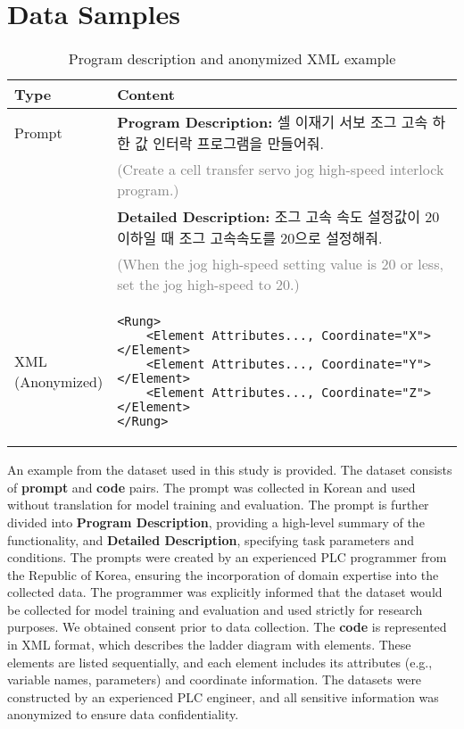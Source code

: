\section{Data Samples}\label{sec:data_samples}

\begin{table*}[!htbp]
    \small
    \centering
    \begin{tabular}{|p{}|p{}|} 
        \toprule
        \textbf{Type} & \textbf{Content} \\ \midrule
        
        Prompt 
        & \textbf{Program Description:} 셀 이재기 서보 조그 고속 하한 값 인터락 프로그램을 만들어줘. \\[3pt]
        & \textcolor{gray}{(Create a cell transfer servo jog high-speed interlock program.)} \\[3pt]
        & \textbf{Detailed Description:} 조그 고속 속도 설정값이 20 이하일 때 조그 고속속도를 20으로 설정해줘. \\[3pt]
        & \textcolor{gray}{(When the jog high-speed setting value is 20 or less, set the jog high-speed to 20.)} \\[3pt] \midrule

        \makecell[l]{XML \\ (Anonymized)}
        & \begin{lstlisting}[basicstyle=\ttfamily, aboveskip=0pt, belowskip=0pt]
<Rung>
    <Element Attributes..., Coordinate="X"></Element>
    <Element Attributes..., Coordinate="Y"></Element>
    <Element Attributes..., Coordinate="Z"></Element>
</Rung>
\end{lstlisting} \\ \bottomrule
    \end{tabular}
    \caption{Program description and anonymized XML example}
    \label{tab:appendix_sample}
\end{table*}

An example from the dataset used in this study is provided. The dataset consists of \textbf{prompt} and \textbf{code} pairs. The prompt was collected in Korean and used without translation for model training and evaluation. The prompt is further divided into \textbf{Program Description}, providing a high-level summary of the functionality, and \textbf{Detailed Description}, specifying task parameters and conditions. The prompts were created by an experienced PLC programmer from the Republic of Korea, ensuring the incorporation of domain expertise into the collected data. The programmer was explicitly informed that the dataset would be collected for model training and evaluation and used strictly for research purposes. We obtained consent prior to data collection. The \textbf{code} is represented in XML format, which describes the ladder diagram with elements. These elements are listed sequentially, and each element includes its attributes (e.g., variable names, parameters) and coordinate information. The datasets were constructed by an experienced PLC engineer, and all sensitive information was anonymized to ensure data confidentiality.